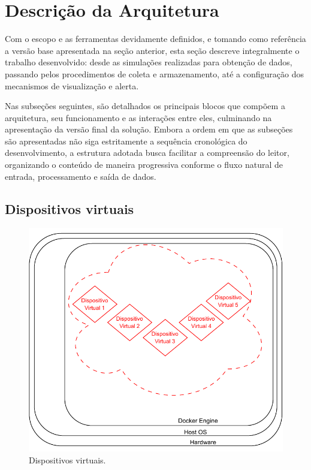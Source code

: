 \section{Descrição da Arquitetura}
\label{section:DescricaoArquitetura}

Com o escopo e as ferramentas devidamente definidos, e tomando como referência a versão base apresentada na seção anterior, esta seção descreve integralmente o trabalho desenvolvido: desde as simulações realizadas para obtenção de dados, passando pelos procedimentos de coleta e armazenamento, até a configuração dos mecanismos de visualização e alerta.

Nas subseções seguintes, são detalhados os principais blocos que compõem a arquitetura, seu funcionamento e as interações entre eles, culminando na apresentação da versão final da solução. Embora a ordem em que as subseções são apresentadas não siga estritamente a sequência cronológica do desenvolvimento, a estrutura adotada busca facilitar a compreensão do leitor, organizando o conteúdo de maneira progressiva conforme o fluxo natural de entrada, processamento e saída de dados.

\subsection{Dispositivos virtuais}
\label{subsection:DispositivosVirtuais}

\begin{figure}[H]
\centering
\includegraphics[scale=1]{Imagens/chap03/by-blocks/virtual_devices_diagram.pdf}
\caption{Dispositivos virtuais.}
\label{fig:DiagramaDispositivosVirtuais}
\end{figure}

